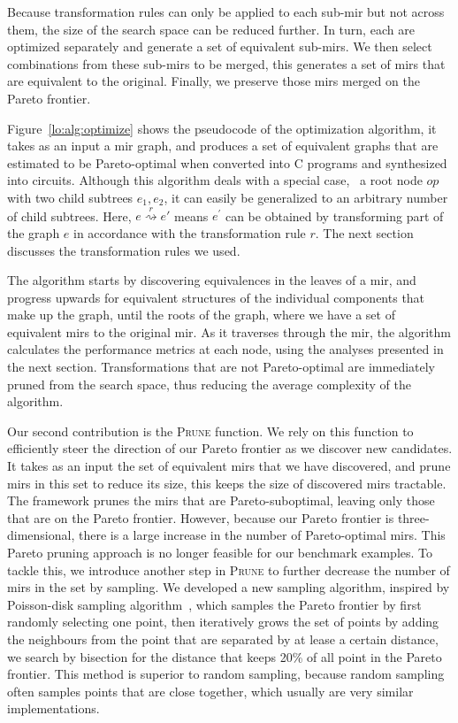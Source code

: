 Because transformation rules can only be applied to each sub-\gls{mir} but not
across them, the size of the search space can be reduced further.  In turn,
each are optimized separately and generate a set of equivalent sub-\glspl{mir}.
We then select combinations from these sub-\glspl{mir} to be merged, this
generates a set of \glspl{mir} that are equivalent to the original.  Finally,
we preserve those \glspl{mir} merged on the Pareto frontier.

Figure~\ref{lo:alg:optimize} shows the pseudocode of the optimization
algorithm, it takes as an input a \gls{mir} graph, and produces a set of
equivalent graphs that are estimated to be Pareto-optimal when converted into
C programs and synthesized into circuits.  Although this algorithm deals with
a special case, \ie~a root node $op$ with two child subtrees $e_1, e_2$, it
can easily be generalized to an arbitrary number of child subtrees.  Here,
$e \stackrel{r}{\rightsquigarrow} e'$ means $e^\prime$ can be obtained by
transforming part of the graph $e$ in accordance with the transformation rule
$r$.  The next section discusses the transformation rules we used.

The algorithm starts by discovering equivalences in the leaves of a \gls{mir},
and progress upwards for equivalent structures of the individual components
that make up the graph, until the roots of the graph, where we have a set of
equivalent \glspl{mir} to the original \gls{mir}\@.  As it traverses through
the \gls{mir}, the algorithm calculates the performance metrics at each node,
using the analyses presented in the next section.  Transformations that are not
Pareto-optimal are immediately pruned from the search space, thus reducing the
average complexity of the algorithm.

Our second contribution is the \textsc{Prune} function.  We rely on this
function to efficiently steer the direction of our Pareto frontier as
we discover new candidates.  It takes as an input the set of equivalent
\glspl{mir} that we have discovered, and prune \glspl{mir} in this set to
reduce its size, this keeps the size of discovered \glspl{mir} tractable.  The
\soap{} framework prunes the \glspl{mir} that are Pareto-suboptimal, leaving
only those that are on the Pareto frontier.  However, because our Pareto
frontier is three-dimensional, there is a large increase in the number of
Pareto-optimal \glspl{mir}.  This Pareto pruning approach is no longer feasible
for our benchmark examples.  To tackle this, we introduce another step in
\textsc{Prune} to further decrease the number of \glspl{mir} in the set by
sampling.  We developed a new sampling algorithm, inspired by Poisson-disk
sampling algorithm~\cite{bridson07}, which samples the Pareto frontier by first
randomly selecting one point, then iteratively grows the set of points by
adding the neighbours from the point that are separated by at lease a certain
distance, we search by bisection for the distance that keeps 20\% of all point
in the Pareto frontier.  This method is superior to random sampling, because
random sampling often samples points that are close together, which usually are
very similar implementations.

